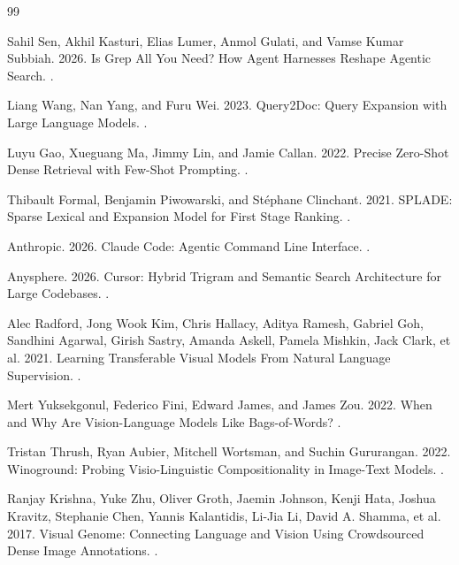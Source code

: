 \documentclass[11pt,a4paper]{article}
\begin{document}
\begin{thebibliography}{99}

Sahil Sen, Akhil Kasturi, Elias Lumer, Anmol Gulati, and Vamse Kumar Subbiah. 2026.
\newblock Is Grep All You Need? How Agent Harnesses Reshape Agentic Search.
.

Liang Wang, Nan Yang, and Furu Wei. 2023.
\newblock Query2Doc: Query Expansion with Large Language Models.
.

Luyu Gao, Xueguang Ma, Jimmy Lin, and Jamie Callan. 2022.
\newblock Precise Zero-Shot Dense Retrieval with Few-Shot Prompting.
.

Thibault Formal, Benjamin Piwowarski, and St{\'e}phane Clinchant. 2021.
\newblock SPLADE: Sparse Lexical and Expansion Model for First Stage Ranking.
.

Anthropic. 2026.
\newblock Claude Code: Agentic Command Line Interface.
.

Anysphere. 2026.
\newblock Cursor: Hybrid Trigram and Semantic Search Architecture for Large Codebases.
.

Alec Radford, Jong Wook Kim, Chris Hallacy, Aditya Ramesh, Gabriel Goh, Sandhini Agarwal, Girish Sastry, Amanda Askell, Pamela Mishkin, Jack Clark, et al. 2021.
\newblock Learning Transferable Visual Models From Natural Language Supervision.
.

Mert Yuksekgonul, Federico Fini, Edward James, and James Zou. 2022.
\newblock When and Why Are Vision-Language Models Like Bags-of-Words?
.

Tristan Thrush, Ryan Aubier, Mitchell Wortsman, and Suchin Gururangan. 2022.
\newblock Winoground: Probing Visio-Linguistic Compositionality in Image-Text Models.
.

Ranjay Krishna, Yuke Zhu, Oliver Groth, Jaemin Johnson, Kenji Hata, Joshua Kravitz, Stephanie Chen, Yannis Kalantidis, Li-Jia Li, David A. Shamma, et al. 2017.
\newblock Visual Genome: Connecting Language and Vision Using Crowdsourced Dense Image Annotations.
.

\end{thebibliography}
\end{document}
